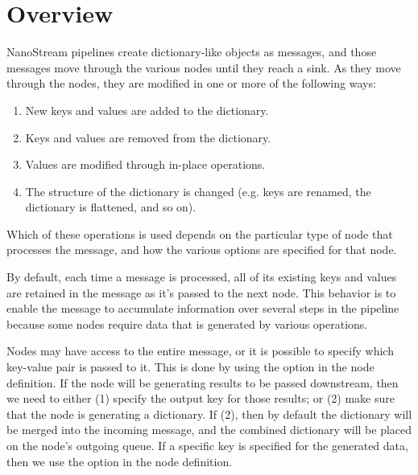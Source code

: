 \documentclass[letterpaper,10pt,english]{sphinxmanual}
\begin{document}
\section{Overview}
\label{\detokenize{data_journey:overview}}
NanoStream pipelines create dictionary-like objects as messages, and those
messages move through the various nodes until they reach a sink. As they move
through the nodes, they are modified in one or more of the following ways:
\begin{enumerate}
\def\theenumi{\arabic{enumi}}
\def\labelenumi{\theenumi .}
\makeatletter\def\p@enumii{\p@enumi \theenumi .}\makeatother
\item {} 
New keys and values are added to the dictionary.

\item {} 
Keys and values are removed from the dictionary.

\item {} 
Values are modified through in-place operations.

\item {} 
The structure of the dictionary is changed (e.g. keys are renamed, the
dictionary is flattened, and so on).

\end{enumerate}

Which of these operations is used depends on the particular type of node that
processes the message, and how the various options are specified for that
node.

By default, each time a message is processed, all of its existing keys and
values are retained in the message as it’s passed to the next node. This
behavior is to enable the message to accumulate information over several steps
in the pipeline because some nodes require data that is generated by various
operations.

Nodes may have access to the entire message, or it is possible to specify
which key-value pair is passed to it. This is done by using the 
option in the node definition. If the node will be generating results to be
passed downstream, then we need to either (1) specify the output key for those results; or
(2) make sure that the node is generating a dictionary. If (2), then by default
the dictionary will be merged into the incoming message, and the
combined dictionary will be placed on the node’s outgoing queue. If a specific
key is specified for the generated data, then we use the 
option in the node definition.
\end{document}
